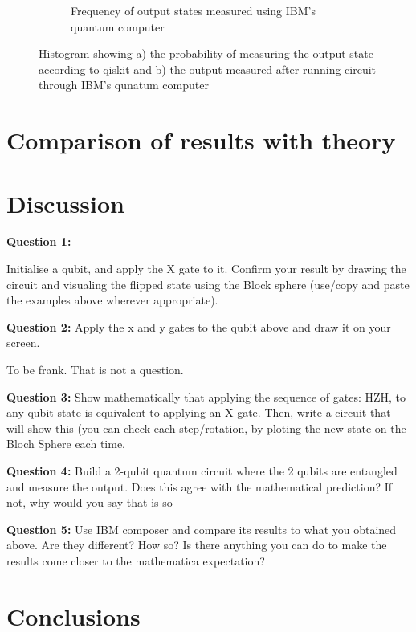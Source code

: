 \begin{figure}[h]
\begin{subfigure}[h]{0.43\textwidth}
        \caption{Frequency of output states measured using IBM's quantum computer} 
        \label{fig:ibmHistogram}
    \end{subfigure}
    \caption{Histogram showing a) the probability of measuring the output state according to qiskit and b) the output measured after running circuit through IBM's qunatum computer} 
    \label{fig:hisogram}
\end{figure}

\section{Comparison of results with theory}
\section{Discussion} \label{sec:discussion}
\textbf{Question 1:}

Initialise a qubit, and apply the X gate to it. Confirm your result by drawing the circuit and visualing the flipped state using the Block sphere (use/copy and paste the examples above wherever appropriate).


\textbf{Question 2:}
Apply the x and y gates to the qubit above and draw it on your screen.

To be frank. That is not a question.

\textbf{Question 3:}
Show mathematically that applying the sequence of gates: HZH, to any qubit state is equivalent to applying an X gate. Then, write a circuit that will show this (you can check each step/rotation, by ploting the new state on the Bloch Sphere each time.


\textbf{Question 4:}
Build a 2-qubit quantum circuit where the 2 qubits are entangled and measure the output. Does this agree with the mathematical prediction? If not, why would you say that is so

\textbf{Question 5:}
Use IBM composer and compare its results to what you obtained above. Are they different? How so? Is there anything you can do to make the results come closer to the mathematica expectation?

\section{Conclusions}